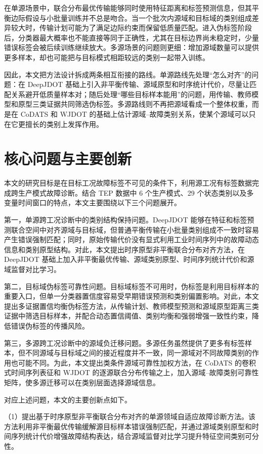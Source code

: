 \documentclass{seuthesis-2022}
\begin{document}
在单源场景中，联合分布最优传输能够同时使用特征距离和标签预测信息，但其平衡边际假设与小批量训练并不总是吻合。当一个批次内源域和目标域的类别组成差异较大时，传输计划可能为了满足边际约束而保留低质量匹配。进入伪标签阶段后，分类器最大概率也不能直接等同于正确性，尤其在目标边界尚未稳定时，少量错误标签会被后续训练继续放大。多源场景的问题则更细：增加源域数量可以提供更多样本，却也可能把与目标模式相距较远的类别一起带入训练。

因此，本文把方法设计拆成两条相互衔接的路线。单源路线先处理“怎么对齐”的问题：在 DeepJDOT 基础上引入非平衡传输、源域原型和时序统计代价，尽量让匹配关系避开低质量样本对；随后处理“哪些目标样本能用”的问题，用传输、教师模型和原型三类证据共同筛选伪标签。多源路线则不再把源域看成一个整体权重，而是在 CoDATS 和 WJDOT 的基础上估计源域--故障类别关系，使某个源域可以只在它更擅长的类别上发挥作用。

\section{核心问题与主要创新}

本文的研究目标是在目标工况故障标签不可见的条件下，利用源工况有标签数据完成跨生产模式故障诊断。结合 TEP 数据中 6 个生产模式、29 个状态类别以及多变量时间窗口的特点，本文主要围绕以下三个问题展开。

第一，单源跨工况诊断中的类别结构保持问题。DeepJDOT 能够在特征和标签预测联合空间中对齐源域与目标域，但普通平衡传输在小批量类别组成不一致时容易产生错误强制匹配；同时，原始传输代价没有显式利用工业时间序列中的故障动态信息和类别原型结构。对此，本文提出时序原型非平衡联合分布对齐方法，在 DeepJDOT 基础上加入非平衡最优传输、源域类别原型、时间序列统计代价和源域监督对比学习。

第二，目标域伪标签可靠性问题。目标域标签不可用时，伪标签是利用目标样本的重要入口，但单一分类器置信度容易受早期错误预测和类别偏置影响。对此，本文提出多证据置信均衡伪标签方法，从传输计划、教师模型预测和源域原型距离三类证据中筛选目标样本，并配合动态置信阈值、类别均衡和强弱增强一致性约束，降低错误伪标签的传播风险。

第三，多源跨工况诊断中的源域负迁移问题。多源任务虽然提供了更多有标签样本，但不同源域与目标域之间的接近程度并不一致，同一源域对不同故障类别的作用也可能不同。为此，本文提出类条件源域可靠性加权方法，在 CoDATS 的卷积式时间序列表征和 WJDOT 的逐源联合分布传输之上，加入源域--故障类别可靠性矩阵，使多源迁移可以在类别层面选择源域信息。

对应上述问题，本文的主要创新点如下。

（1）提出基于时序原型非平衡联合分布对齐的单源领域自适应故障诊断方法。该方法利用非平衡最优传输缓解源目标样本错误强制匹配，并通过源域类别原型和时间序列统计代价增强故障结构表达，结合源域监督对比学习提升特征空间类别可分性。
\end{document}

